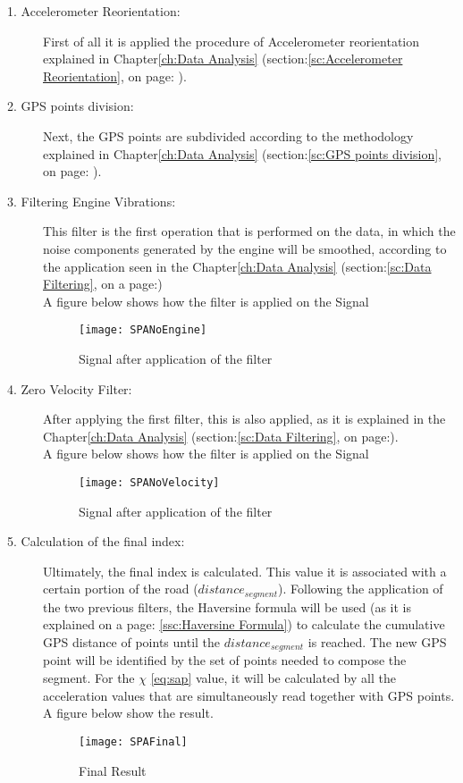 \documentclass[tesi]{subfiles}
\begin{document}
\begin{description}
\item[1. Accelerometer Reorientation:] First of all it is applied the procedure of Accelerometer reorientation explained in Chapter\ref{ch:Data Analysis} (section:\ref{sc:Accelerometer Reorientation}, on page: \pageref{sc:Accelerometer Reorientation}).
\item[2. GPS points division:] Next, the GPS points are subdivided according to the methodology explained in Chapter\ref{ch:Data Analysis} (section:\ref{sc:GPS points division}, on page: \pageref{sc:GPS points division}).
\item[3. Filtering Engine Vibrations:] This filter is the first operation that is performed on the data, in which the noise components generated by the engine will be smoothed, according to the application seen in the Chapter\ref{ch:Data Analysis} (section:\ref{sc:Data Filtering}, on a page:\pageref{sssc:Remove Engine Vibrations Filter})\\
A figure below shows how the filter is applied on the Signal
\begin{figure}[H]
\centering
\texttt{[image: SPANoEngine]}
\caption{Signal after application of the filter}
\end{figure}
\item[4. Zero Velocity Filter:] After applying the first filter, this is also applied, as it is explained in the Chapter\ref{ch:Data Analysis} (section:\ref{sc:Data Filtering}, on page:\pageref{sssc:Zero Velocity Filter}).\\
A figure below shows how the filter is applied on the Signal
\begin{figure}[H]
\centering
\texttt{[image: SPANoVelocity]}
\caption{Signal after application of the filter}
\end{figure}
\item[5. Calculation of the final index:] Ultimately, the final index is calculated. 
This value it is associated with a certain portion of the road ($distance_{segment}$). Following the application of the two previous filters, the Haversine formula will be used (as it is explained on a page: \ref{ssc:Haversine Formula}) to calculate the cumulative GPS distance of points until the $distance_{segment}$ is reached. The new GPS point will be identified by the set of points needed to compose the segment. For the $\chi$ \thinspace \ref{eq:sap} value, it will be calculated by all the acceleration values that are simultaneously read together with GPS points.\\
A figure below show the result.
\begin{figure}[H]
\centering
\texttt{[image: SPAFinal]}
\caption{Final Result}
\end{figure}\label{fig:Simple Accelerations Points Final Result}
\end{description}
\end{document}
